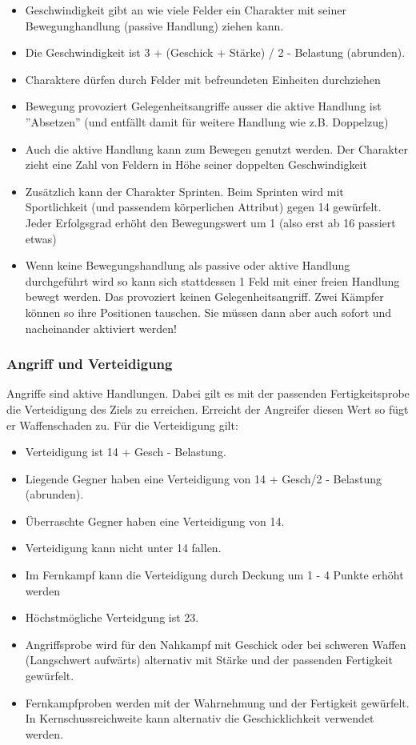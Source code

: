 \documentclass{article}
\begin{document}
\begin{itemize}
\item Geschwindigkeit gibt an wie viele Felder ein Charakter mit seiner Bewegunghandlung (passive Handlung) ziehen kann.
\item Die Geschwindigkeit ist 3 + (Geschick + Stärke) / 2 - Belastung (abrunden).
\item Charaktere dürfen durch Felder mit befreundeten Einheiten durchziehen
\item Bewegung provoziert Gelegenheitsangriffe ausser die aktive Handlung ist ''Absetzen'' (und entfällt damit für weitere Handlung wie z.B. Doppelzug)
\item Auch die aktive Handlung kann zum Bewegen genutzt werden. Der Charakter zieht eine Zahl von Feldern in Höhe seiner doppelten Geschwindigkeit
\item Zusätzlich kann der Charakter Sprinten. Beim Sprinten wird mit Sportlichkeit (und passendem körperlichen Attribut) gegen 14 gewürfelt. Jeder Erfolgsgrad erhöht den Bewegungswert um 1 (also erst ab 16 passiert etwas)
\item Wenn keine Bewegungshandlung als passive oder aktive Handlung durchgeführt wird so kann sich stattdessen 1 Feld mit einer freien Handlung bewegt werden. Das provoziert keinen Gelegenheitsangriff. Zwei Kämpfer können so ihre Positionen tauschen. Sie müssen dann aber auch sofort und nacheinander aktiviert werden!
\end{itemize}

\subsubsection{Angriff und Verteidigung}

Angriffe sind aktive Handlungen. Dabei gilt es mit der passenden Fertigkeitsprobe die Verteidigung des Ziels zu
erreichen. Erreicht der Angreifer diesen Wert so fügt er Waffenschaden zu. Für die Verteidigung gilt:

\begin{itemize}
\item Verteidigung ist 14 + Gesch - Belastung.
\item Liegende Gegner haben eine Verteidigung von 14 + Gesch/2 - Belastung (abrunden).
\item Überraschte Gegner haben eine Verteidigung von 14.
\item Verteidigung kann nicht unter 14 fallen.
\item Im Fernkampf kann die Verteidigung durch Deckung um 1 - 4 Punkte erhöht werden
\item Höchstmögliche Verteidgung ist 23.
\item Angriffsprobe wird für den Nahkampf mit Geschick oder bei schweren Waffen (Langschwert aufwärts) alternativ mit Stärke und der passenden Fertigkeit gewürfelt.
\item Fernkampfproben werden mit der Wahrnehmung und der Fertigkeit gewürfelt. In Kernschussreichweite kann alternativ die Geschicklichkeit verwendet werden.
\end{itemize}
\end{document}
